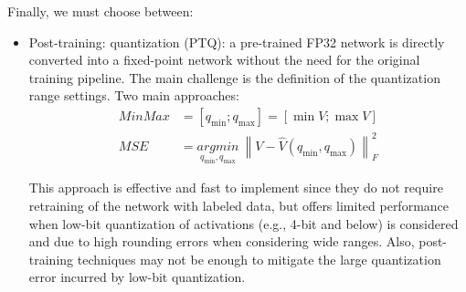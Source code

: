 \documentclass{article}
\begin{document}
        Finally, we must choose between:
        \begin{itemize}
          \item Post-training: quantization (PTQ): a pre-trained FP32 network is directly converted into a fixed-point network without the need for the original training pipeline.
          The main challenge is the definition of the quantization range settings. Two main approaches: 
          \begin{equation}
            \begin{array}{ll}
              MinMax & = [q_{\min};q_{\max}] = [\min V;\max V] \\
              MSE     & = \underset{q_{\min},q_{\max}}{argmin} \ \left\| V-\hat{V}(q_{\min},q_{\max}) \right\|_F^2
            \end{array}
          \end{equation}

          This approach is effective and fast to implement since they do not require retraining of the network with labeled data, but offers limited performance when low-bit quantization of activations (e.g., 4-bit and below) is considered
          and due to high rounding errors when considering wide ranges. Also, post-training techniques may not be enough to mitigate the large quantization error incurred by low-bit quantization.
          

\end{itemize}
\end{document}
